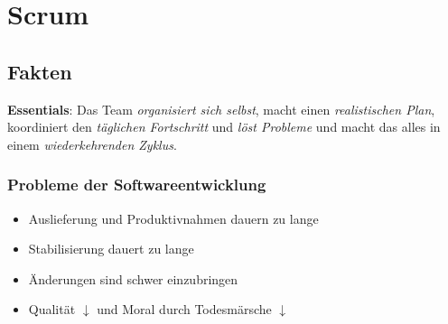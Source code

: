 \def\home{../../styles}





\newcommand{\pdfauthor}{Matthias Günther}
\newcommand{\pdftitle}{Scrum}
\newcommand{\pdfsubject}{Aufzeichnungen zur Fortbildung}
\newcommand{\pdfkeywords}{ruby}
\newcommand{\motto}{git works and work and works ...}
\newcommand{\tutor}{}
\newcommand{\disclaimer}{(Die Autoren übernehmen keine Garantie und Haftung
für die Korrektheit des Skriptes. Das Skript ist unter den Namen von Matthias
Günther veröffentlicht.)}
\newcommand{\publisher}{Der Helex-Matze Verlag $\sum\limits_{i=1}^{n}i$}
\newcommand{\pdfemail}{matthias.guenther@wikimatze.de}
\newcommand{\correctiontext}{Kommentare/Korrekturen an}
\newcommand{\homepagetext}{Homepage}
\newcommand{\homepage}{wikimatze.de}
\newcommand{\coverdisclaimer}{Copyright Skript-Covers}
\newcommand{\covercopyright}{\textsc{Ubisoft} (\url{ubi.com})}














\section{Scrum}
\subsection{Fakten}
\textbf{Essentials}: Das Team \textit{organisiert sich selbst}, macht einen
\textit{realistischen Plan}, koordiniert den \textit{täglichen Fortschritt} und \textit{löst
  Probleme} und macht das alles in einem \textit{wiederkehrenden Zyklus}.


\subsubsection{Probleme der Softwareentwicklung}
\begin{itemize}
  \item Auslieferung und Produktivnahmen dauern zu lange
  \item Stabilisierung dauert zu lange
  \item Änderungen sind schwer einzubringen
  \item Qualität $\downarrow$ und Moral durch Todesmärsche $\downarrow$
\end{itemize}

